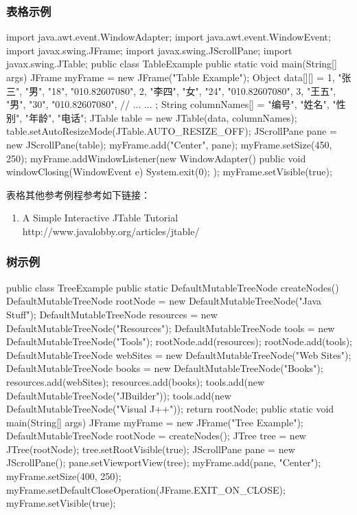 \subsubsection{表格示例}

\begin{javaCode}
  import java.awt.event.WindowAdapter;
  import java.awt.event.WindowEvent;
  import javax.swing.JFrame;
  import javax.swing.JScrollPane;
  import javax.swing.JTable;
  public class TableExample {
    public static void main(String[] args) {
      JFrame myFrame = new JFrame("Table Example");
      Object data[][] = {
        {1, "张三", "男", "18", "010.82607080"},
        {2, "李四", "女", "24", "010.82607080"},
        {3, "王五", "男", "30", "010.82607080"},
        // ... ...
      };
      String columnNames[] = {
        "编号", "姓名", "性别", "年龄", "电话"};
      JTable table = new JTable(data, columnNames);
      table.setAutoResizeMode(JTable.AUTO_RESIZE_OFF);
      JScrollPane pane = new JScrollPane(table);
      myFrame.add("Center", pane);
      myFrame.setSize(450, 250);
      myFrame.addWindowListener(new WindowAdapter(){
        public void windowClosing(WindowEvent e) {
          System.exit(0);
        }
      });
      myFrame.setVisible(true);
    }
  }
\end{javaCode}

表格其他参考例程参考如下链接：
\begin{enumerate}
\item A Simple Interactive JTable Tutorial\\
  http://www.javalobby.org/articles/jtable/
\end{enumerate}

\subsubsection{树示例}

\begin{javaCode}
  public class TreeExample {
    public static DefaultMutableTreeNode createNodes() {
      DefaultMutableTreeNode rootNode = new DefaultMutableTreeNode("Java Stuff");
      DefaultMutableTreeNode resources = new DefaultMutableTreeNode("Resources");
      DefaultMutableTreeNode tools = new DefaultMutableTreeNode("Tools");
      rootNode.add(resources);
      rootNode.add(tools);
      DefaultMutableTreeNode webSites = new DefaultMutableTreeNode("Web Sites");
      DefaultMutableTreeNode books = new DefaultMutableTreeNode("Books");
      resources.add(webSites);
      resources.add(books);
      tools.add(new DefaultMutableTreeNode("JBuilder"));
      tools.add(new DefaultMutableTreeNode("Visual J++"));
      return rootNode;
    }
    public static void main(String[] args) {
      JFrame myFrame = new JFrame("Tree Example");
      DefaultMutableTreeNode rootNode = createNodes();
      JTree tree = new JTree(rootNode);
      tree.setRootVisible(true);
      JScrollPane pane = new JScrollPane();
      pane.setViewportView(tree);
      myFrame.add(pane, "Center");
      myFrame.setSize(400, 250);
      myFrame.setDefaultCloseOperation(JFrame.EXIT_ON_CLOSE);
      myFrame.setVisible(true);
    }
  }
\end{javaCode}

